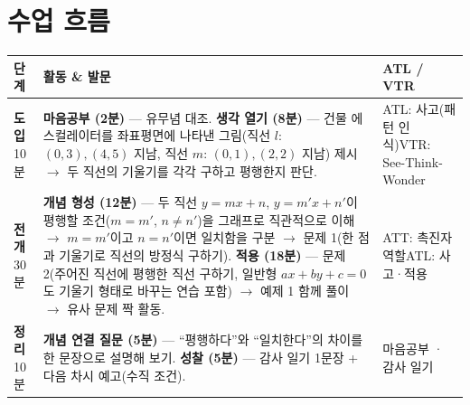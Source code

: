 \documentclass[11pt,a4paper]{article}
\begin{document}
\section{수업 흐름}

\begin{tabularx}{\linewidth}{@{}>{\centering\arraybackslash}p{1.6cm}X>{\raggedright\arraybackslash\small}p{3.1cm}@{}}
\toprule
\textbf{단계} & \textbf{활동 \& 발문} & \textbf{ATL / VTR} \\
\midrule
\textcolor{goldstrong}{\textbf{도입}}\newline\footnotesize 10분 &
\textbf{마음공부 (2분)} --- 유무념 대조.\newline
\textbf{생각 열기 (8분)} --- 건물 에스컬레이터를 좌표평면에 나타낸 그림(직선 $l$: $(0,3),(4,5)$ 지남, 직선 $m$: $(0,1),(2,2)$ 지남) 제시 $\to$ 두 직선의 기울기를 각각 구하고 평행한지 판단. &
ATL: 사고(패턴 인식)\newline VTR: See-Think-Wonder \\
\addlinespace
\textcolor{goldstrong}{\textbf{전개}}\newline\footnotesize 30분 &
\textbf{개념 형성 (12분)} --- 두 직선 $y=mx+n$, $y=m'x+n'$이 평행할 조건($m=m'$, $n\neq n'$)을 그래프로 직관적으로 이해 $\to$ $m=m'$이고 $n=n'$이면 일치함을 구분 $\to$ 문제 1(한 점과 기울기로 직선의 방정식 구하기).\newline
\textbf{적용 (18분)} --- 문제 2(주어진 직선에 평행한 직선 구하기, 일반형 $ax+by+c=0$도 기울기 형태로 바꾸는 연습 포함) $\to$ 예제 1 함께 풀이 $\to$ 유사 문제 짝 활동. &
ATT: 촉진자 역할\newline ATL: 사고·적용 \\
\addlinespace
\textcolor{goldstrong}{\textbf{정리}}\newline\footnotesize 10분 &
\textbf{개념 연결 질문 (5분)} --- ``평행하다''와 ``일치한다''의 차이를 한 문장으로 설명해 보기.\newline
\textbf{성찰 (5분)} --- 감사 일기 1문장 + 다음 차시 예고(수직 조건). &
마음공부 · 감사 일기 \\
\bottomrule
\end{tabularx}
\end{document}
